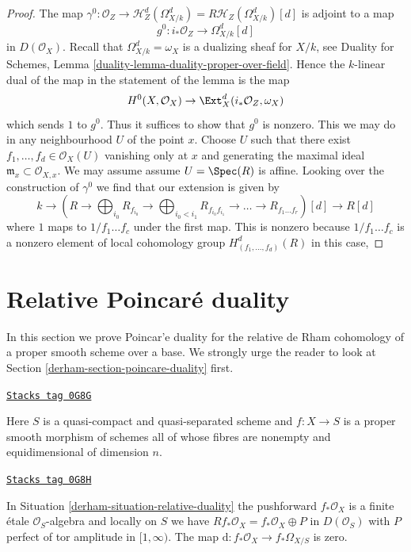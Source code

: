 \begin{proof}
The map $\gamma^0 : \mathcal{O}_Z \to
\mathcal{H}^d_Z(\Omega^d_{X/k}) = R\mathcal{H}_Z(\Omega^d_{X/k})[d]$
is adjoint to a map
$$
g^0 : i_*\mathcal{O}_Z \longrightarrow \Omega^d_{X/k}[d]
$$
in $D(\mathcal{O}_X)$. Recall that $\Omega^d_{X/k} = \omega_X$ is a
dualizing sheaf for $X/k$, see
Duality for Schemes, Lemma \ref{duality-lemma-duality-proper-over-field}.
Hence the $k$-linear dual of the map in the statement
of the lemma is the map
$$
H^0(X, \mathcal{O}_X) \to \Ext^d_X(i_*\mathcal{O}_Z, \omega_X)
$$
which sends $1$ to $g^0$. Thus it suffices to show that $g^0$ is nonzero.
This we may do in any neighbourhood $U$ of the point $x$. Choose $U$
such that there exist $f_1, \ldots, f_d \in \mathcal{O}_X(U)$
vanishing only at $x$ and generating the maximal ideal
$\mathfrak m_x \subset \mathcal{O}_{X, x}$. We may assume
assume $U = \Spec(R)$ is affine. Looking over the
construction of $\gamma^0$ we find that our extension is given by
$$
k \to
(R \to \bigoplus\nolimits_{i_0} R_{f_{i_0}} \to
\bigoplus\nolimits_{i_0 < i_1} R_{f_{i_0}f_{i_1}} \to
\ldots \to R_{f_1\ldots f_r})[d] \to R[d]
$$
where $1$ maps to $1/f_1 \ldots f_c$ under the first map.
This is nonzero because $1/f_1 \ldots f_c$ is a nonzero element
of local cohomology group $H^d_{(f_1, \ldots, f_d)}(R)$ in this case,
\end{proof}

\section{Relative Poincar\'e duality}
\label{derham-section-relative-poincare-duality}
In this section we prove Poincar'e duality for the relative de Rham cohomology
of a proper smooth scheme over a base. We strongly urge the reader to
look at Section \ref{derham-section-poincare-duality} first.

\begin{definition}
\label{derham-situation-relative-duality}
\href{https://stacks.math.columbia.edu/tag/0G8G}{\texttt{Stacks tag 0G8G}}

Here $S$ is a quasi-compact and quasi-separated scheme and
$f : X \to S$ is a proper smooth morphism of schemes all of whose
fibres are nonempty and equidimensional of dimension $n$.
\end{definition}

\begin{lemma}
\label{derham-lemma-relative-bottom-part-degenerates}
\href{https://stacks.math.columbia.edu/tag/0G8H}{\texttt{Stacks tag 0G8H}}

In Situation \ref{derham-situation-relative-duality} the pushforward
$f_*\mathcal{O}_X$ is a finite \'etale $\mathcal{O}_S$-algebra
and locally on $S$ we have $Rf_*\mathcal{O}_X = f_*\mathcal{O}_X \oplus P$
in $D(\mathcal{O}_S)$ with $P$ perfect of tor amplitude in $[1, \infty)$.
The map $\text{d} : f_*\mathcal{O}_X \to f_*\Omega_{X/S}$ is zero.
\end{lemma}

